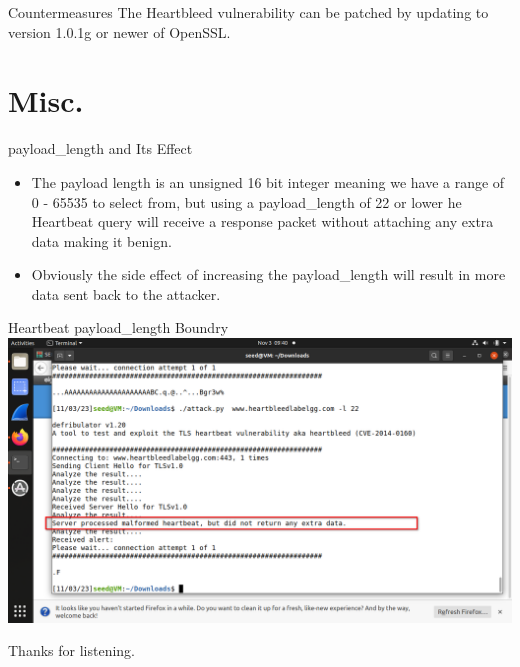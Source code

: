 \documentclass{beamer}
\begin{document}
\begin{frame}{Countermeasures}
    The Heartbleed vulnerability can be patched by updating to version 1.0.1g or newer of
    OpenSSL.
\end{frame}

\section{Misc.}
\begin{frame}{payload\_length and Its Effect}
    \begin{itemize}
        \item
            The payload length is an unsigned 16 bit integer meaning we have a range of 0 - 65535
            to select from, but using a payload\_length of 22 or lower he Heartbeat query will
            receive a response packet without attaching any extra data making it benign.
        \item
            Obviously the side effect of increasing the payload\_length will result in more data
            sent back to the attacker.
    \end{itemize}
\end{frame}

\begin{frame}{Heartbeat payload\_length Boundry}
    \includegraphics[width=\textwidth]{heartbleed_boundry.png}
\end{frame}

\begin{frame}
    Thanks for listening.
\end{frame}
\end{document}
